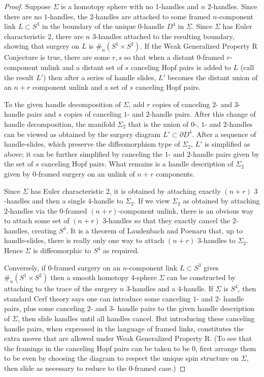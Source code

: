 \documentclass{amsart}
\newcommand{\bdd}{\mbox{$\partial$}}
\begin{document}
\begin{proof}  Suppose $\Sigma$ is a homotopy sphere with no 1-handles and $n$ $2$-handles.  Since there are no $1$-handles, the $2$-handles are attached to some framed $n$-component link $L \subset S^3$ in the boundary of the unique $0$-handle $D^4$ in $\Sigma$. Since $\Sigma$ has Euler characteristic 2, there are $n$ 3-handles attached to the resulting boundary, showing that surgery on $L$ is $\#_n(S^1\times S^2)$.  If the Weak Generalized Property R Conjecture is true, there are some $r, s$ so that when a distant $0$-framed $r$-component unlink and a distant set of $s$ canceling Hopf pairs is added to $L$ (call the result $L'$) then after a series of handle slides, $L'$ becomes the distant union of an $n+r$ component unlink and a set of $s$ canceling Hopf pairs.

To the given handle decomposition of $\Sigma$, add $r$ copies of canceling $2$- and $3$- handle pairs and $s$ copies of canceling $1$- and $2$-handle pairs.  After this change of handle decomposition, the manifold $\Sigma_2$ that is the union of $0$-, $1$- and $2$-handles can be viewed as obtained by the surgery diagram $L' \subset \bdd D^4$.  After a sequence of handle-slides, which preserve the diffeomorphism type of $\Sigma_2$, $L'$ is simplified as above; it can be further simplified by canceling the $1$- and $2$-handle pairs given by the set of $s$ canceling Hopf pairs.  What remains is a handle description of $\Sigma_2$ given by $0$-framed surgery on an unlink of $n+r$ components.

Since $\Sigma$ has Euler characteristic 2, it is obtained by attaching exactly $(n+r)$ $3$-handles and then a single $4$-handle to $\Sigma_2$.  If we view $\Sigma_2$ as obtained by attaching $2$-handles via the $0$-framed $(n+r)$-component unlink, there is an obvious way to attach some set of $(n+r)$ $3$-handles so that they exactly cancel the $2$-handles, creating $S^4$.  It is a theorem of Laudenbach and Poenaru \cite{LP} that, up to handle-slides, there is really only one way to attach $(n+r)$ $3$-handles to $\Sigma_2$.  Hence $\Sigma$ is diffeomorphic to $S^4$ as required.

Conversely, if $0$-framed surgery on an $n$-component link $L \subset S^3$ gives $\#_{n} (S^{1} \times S^{2})$ then a smooth homotopy $4$-sphere $\Sigma$ can be constructed by attaching to the trace of the surgery $n$ $3$-handles and a $4$-handle.  If $\Sigma$ is $S^4$, then standard Cerf theory says one can introduce some canceling $1$- and $2$- handle pairs, plus some canceling $2$- and $3$- handle pairs to the given handle description of $\Sigma$, then slide handles until all handles cancel.  But introducing these canceling handle pairs, when expressed in the language of framed links, constitutes the extra moves that are allowed under Weak Generalized Property R. (To see that the framings in the canceling Hopf pairs can be taken to be 0, first arrange them to be even by choosing the diagram to respect the unique spin structure on $\Sigma$, then slide as necessary to reduce to the 0-framed case.)\end{proof}
\end{document}
